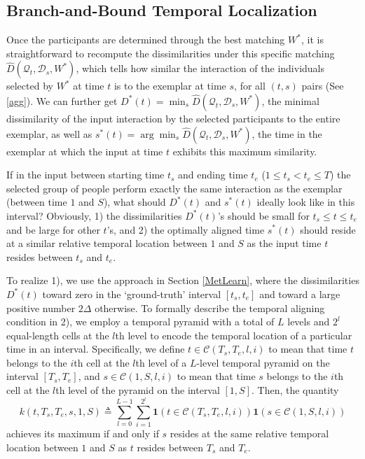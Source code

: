 \subsection{Branch-and-Bound Temporal Localization}
\label{BB}


Once the participants are determined through the best matching $W^{*}$, it is straightforward to recompute the dissimilarities under this specific matching $\hat{D}(\mathcal{Q}_{t}, \mathcal{D}_{s}, W^{*})$, which tells how similar the interaction of the individuals selected by $W^{*}$ at time $t$ is to the exemplar at time $s$, for all $(t,s)$ pairs (See \ref{agg}). We can further get  $D^{*}(t)=\min_{s}\hat{D}(\mathcal{Q}_{t}, \mathcal{D}_{s}, W^{*})$, the minimal dissimilarity of the input interaction by the selected participants to the entire exemplar, as well as $s^{*}(t)=\arg\min_{s}\hat{D}(\mathcal{Q}_{t}, \mathcal{D}_{s}, W^{*})$, the time in the exemplar at which the input at time $t$ exhibits this maximum similarity.  

If in the input between starting time $t_{s}$ and ending time $t_{e}$ ($1\leq t_{s}<t_{e}\leq T$) the selected group of people perform exactly the same interaction as the exemplar (between time $1$ and $S$), what should $D^{*}(t)$ and $s^{*}(t)$ ideally look like in this interval? Obviously, 1) the dissimilarities $D^{*}(t)$'s should be small for $t_{s}\le t\le t_{e}$ and be large for other $t$'s, and 2) the optimally aligned time $s^{*}(t)$ should reside at a similar relative temporal location between $1$ and $S$ as the input time $t$ resides between $t_{s}$ and $t_{e}$.

To realize 1), we use the approach in Section \ref{MetLearn}, where the dissimilarities $D^{*}(t)$ toward zero in the `ground-truth' interval $[t_{s}, t_{e}]$ and toward a large positive number $2\Delta$ otherwise. To formally describe the temporal aligning condition in 2), we employ a temporal pyramid with a total of $L$ levels and $2^{l}$ equal-length cells at the $l$th level to encode the temporal location of a particular time in an interval. Specifically, we define $t\in\mathcal{C}(T_{s},T_{e}, l,i)$ to mean that time $t$ belongs to the $i$th cell at the $l$th level of a $L$-level temporal pyramid on the interval $[T_{s},T_{e}]$, and $s\in\mathcal{C}(1,S, l,i)$ to mean that time $s$ belongs to the $i$th cell at the $l$th level of the pyramid on the interval $[1,S]$. Then, the quantity
\begin{equation}
k(t, T_{s},T_{e}, s, 1,S)\triangleq\sum^{L-1}_{l=0}\sum^{2^{l}}_{i=1} \mathbf{1}(t\in\mathcal{C}(T_{s},T_{e}, l,i))\mathbf{1}(s\in\mathcal{C}(1,S, l,i))
\end{equation}
achieves its maximum if and only if $s$ resides at the same relative temporal location between $1$ and $S$ as $t$ resides between $T_{s}$ and $T_{e}$.

